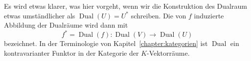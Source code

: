 Es wird etwas klarer, was hier vorgeht, wenn wir die Konstruktion
des Dualraum etwas umständlicher als $\operatorname{Dual}(U)=U^*$
schreiben.
Die von $f$ induzierte Abbildung der Dualräume wird dann mit
\[
f^*
=
\operatorname{Dual}(f)
\colon 
\operatorname{Dual}(V)
\to
\operatorname{Dual}(U)
\]
bezeichnet.
In der Terminologie von Kapitel~\ref{chapter:kategorien} ist
$\operatorname{Dual}$ ein kontravarianter Funktor in der Kategorie
der $K$-Vektorräume.

